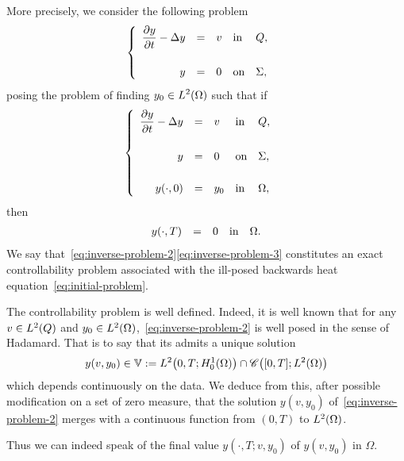 More precisely, we consider the following problem
\begin{equation*}\label{eq:inverse-problem-1}
    \begin{cases}\displaystyle
        \begin{array}{rclll}
            \dfrac{\partial{}y}{\partial{}t} - \Delta y & = & v & \text{in} & Q,\\
            \\
            y & = & 0 & \text{on} & \Sigma,
        \end{array}
    \end{cases}
\end{equation*}
posing the problem of finding $\displaystyle y_{0}\in L^{2}\!\left({\Omega}\right)$ such
that if
\begin{equation}\label{eq:inverse-problem-2}
    \begin{cases}\displaystyle
        \begin{array}{rclll}
            \dfrac{\partial{}y}{\partial{}t} - \Delta y & = & v & \text{in} & Q,\\
            \\
            y & = & 0 & \text{on} & \Sigma,\\
            \\
            {y}\!\left({\cdot, 0}\right) & = & y_{0} & \text{in} & \Omega,
        \end{array}
    \end{cases}
\end{equation}
then
\begin{equation}\label{eq:inverse-problem-3}
    \begin{array}{rclll}
        {y}\!\left({\cdot,T}\right) & = & 0 & \text{in} & \Omega.
    \end{array}
\end{equation}
We say that~\eqref{eq:inverse-problem-2}\eqref{eq:inverse-problem-3}
constitutes an exact controllability problem associated with the ill-posed
backwards heat equation~\eqref{eq:initial-problem}.

\begin{remarque}%
    The controllability problem is well defined. Indeed, it is well known
    that for any $v\in L^{2}\!\left({Q}\right)$ and
    $y_{0}\in L^{2}\!\left({\Omega}\right)$,~\eqref{eq:inverse-problem-2} is well posed in
    the sense of Hadamard. That is to say that its admits a unique solution
    \begin{equation*}\label{eq:well-posedness-heat-equation}
        y\!\left({v,y_{0}}\right)\in \mathbb{V} := L^{2}\!\left({0,T;
        H_{0}^{1}(\Omega)}\right)\cap \mathscr{C}\!\left({[0,T];L^{2}\!\left({\Omega}\right)}\right)
    \end{equation*}
    which depends continuously on the data. We deduce from this, after
    possible modification on a set of zero measure, that the solution
    $y\!\left({v,y_{0}}\right)$ of~\eqref{eq:inverse-problem-2} merges with
    a continuous function from $(0,T)$ to $L^{2}\!\left({\Omega}\right)$.

    Thus we can indeed speak of the final value
    $y\!\left({\cdot,T;v,y_{0}}\right)$ of $y\!\left({v,y_{0}}\right)$ in
    $\Omega$.
\end{remarque}

